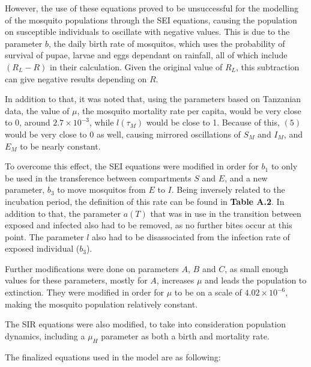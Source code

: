 \documentclass[a4paper,fleqn]{cas-dc}
\begin{document}
However, the use of these equations proved to be unsuccessful for the modelling of the mosquito populations through the SEI equations, 
causing the population on susceptible individuals to oscillate with negative values. This is due to the parameter $b$, the daily birth rate of mosquitos, 
which uses the probability of survival of pupae, larvae and eggs dependant on rainfall, all of which include $(R_L - R)$ in their calculation. Given the original 
value of $R_L$, this subtraction can give negative results depending on $R$. 

In addition to that, it was noted that, using the parameters based on Tanzanian 
data, the value of $\mu$, the mosquito mortality rate per capita, would be very close to 0, around $2.7 \times 10^{-3}$, while $l(\tau_M)$ would be close to 1. Because of this, $(5)$ would be very close to 0 as 
well, causing mirrored oscillations of $S_M$ and $I_M$, and $E_M$ to be nearly constant.

To overcome this effect, the SEI equations were modified in order for $b_1$ to only be used in the transference between compartments $S$ and $E$, 
and a new parameter, $b_3$ to move mosquitos from $E$ to $I$. Being inversely related to the incubation period, the definition of this rate can be found in \textbf{Table A.2}. 
In addition to that, the parameter $a(T)$ that was in use in the transition between exposed and infected also had to be removed, as no further bites occur at this point. 
The parameter $l$ also had to be disassociated from the infection rate of exposed individual ($b_3$).

Further modifications were done on parameters $A$, $B$ and $C$, as small enough values for these parameters, mostly for $A$, increases $\mu$ 
and leads the population to extinction. They were modified in order for $\mu$ to be on 
a scale of $4.02 \times 10^{-6}$, making the mosquito population relatively constant. 

The SIR equations were also modified, to take into consideration population dynamics, including a $\mu_H$ parameter as both a birth and mortality rate.

The finalized equations used in the model are as following:  
\end{document}
